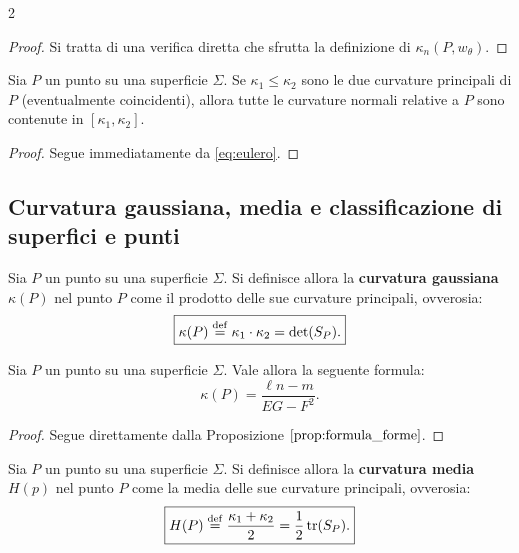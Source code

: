 \begin{multicols*}{2}
    \begin{proof}
        Si tratta di una verifica diretta che sfrutta la definizione di
        $\kappa_n(P, w_\theta)$.
    \end{proof}

    \begin{proposition}
        Sia $P$ un punto su una superficie $\Sigma$. Se $\kappa_1 \leq \kappa_2$ sono
        le due curvature principali di $P$ (eventualmente coincidenti), allora
        tutte le curvature normali relative a $P$ sono contenute in $[\kappa_1, \kappa_2]$.
    \end{proposition}

    \begin{proof}
        Segue immediatamente da \eqref{eq:eulero}.
    \end{proof}

    \subsection{Curvatura gaussiana, media e classificazione di superfici e punti}

    \begin{definition}
        Sia $P$ un punto su una superficie $\Sigma$. Si definisce allora
        la \textbf{curvatura gaussiana} $\kappa(P)$ nel punto $P$ come il prodotto delle
        sue curvature principali, ovverosia:
        \[
            \boxed{\kappa(P) \overset{\mathrm{def}}{=} \kappa_1 \cdot \kappa_2 = \det(S_P).}
        \]
    \end{definition}

    \begin{proposition}
        Sia $P$ un punto su una superficie $\Sigma$. Vale allora la seguente formula:
        \[
            \boxed{\kappa(P) = \frac{\ell n - m}{EG - F^2}.}
        \]
    \end{proposition}

    \begin{proof}
        Segue direttamente dalla Proposizione $\ref{prop:formula_forme}$.
    \end{proof}

    \begin{proposition}
        Sia $P$ un punto su una superficie $\Sigma$. Si definisce allora
        la \textbf{curvatura media} $H(p)$ nel punto $P$ come la media delle sue
        curvature principali, ovverosia:
        \[
            \boxed{H(P) \overset{\mathrm{def}}{=} \frac{\kappa_1 + \kappa_2}{2} = \frac{1}{2} \operatorname{tr}(S_P).}
        \]
    \end{proposition}


\end{multicols*}
